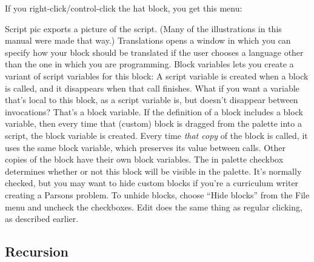 If you right-click/control-click the hat block, you get this menu:

Script pic exports a picture of the script. (Many of the illustrations
in this manual were made that way.) Translations opens a window in which
you can specify how your block should be translated if the user chooses
a language other than the one in which you are programming. Block
variables lets you create a variant of script variables for this block:
A script variable is created when a block is called, and it disappears
when that call finishes. What if you want a variable that's local to
this block, as a script variable is, but doesn't disappear between
invocations? That's a block variable. If the definition of a block
includes a block variable, then every time that (custom) block is
dragged from the palette into a script, the block variable is created.
Every time \emph{that copy} of the block is called, it uses the same
block variable, which preserves its value between calls. Other copies of
the block have their own block variables. The in palette checkbox
determines whether or not this block will be visible in the palette.
It's normally checked, but you may want to hide custom blocks if you're
a curriculum writer creating a Parsons problem. To unhide blocks, choose
``Hide blocks'' from the File menu and uncheck the checkboxes. Edit does
the same thing as regular clicking, as described earlier.

\subsection{Recursion}\label{recursion}

